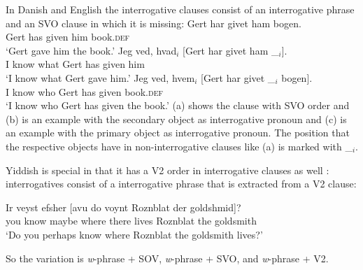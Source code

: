 In Danish and English the interrogative clauses consist of an interrogative phrase and an SVO clause
in which it is missing:
\eal
\ex 
\gll Gert har givet ham bogen.\\
     Gert has given him book.\textsc{def}\\
\glt `Gert gave him the book.'
\ex
\gll Jeg ved, hvad$_i$ [Gert har givet ham \_$_i$].\\
     I know what \spacebr{}Gert has given him\\
\glt `I know what Gert gave him.'
\ex
\gll Jeg ved, hvem$_i$ [Gert har givet \_$_i$   bogen].\\
     I know who        \spacebr{}Gert has given {} book.\textsc{def}\\
\glt `I know who Gert has given the book.'
\zl
(a) shows the clause with SVO order and (b) is an example with the secondary object as
interrogative pronoun and (c) is an example with the primary object as interrogative
pronoun. The position that the respective objects have in non-interrogative clauses like (a)
is marked with \_$_i$.

Yiddish is special in that it has a V2 order in interrogative clauses as well \citep[Sections~4.1, 4.2]{Diesing90a}: interrogatives
consist of a interrogative phrase that is extracted from a V2 clause:

\ea
\gll Ir veyst efsher [avu            do    voynt Roznblat   der goldshmid]?\footnotemark\\
     you know maybe  \spacebr{}where there lives Roznblat the goldsmith\\
\glt `Do you perhaps know where Roznblat the goldsmith lives?' 
\z


So the variation is \emph{w}-phrase + SOV, \emph{w}-phrase + SVO, and \emph{w}-phrase + V2.


